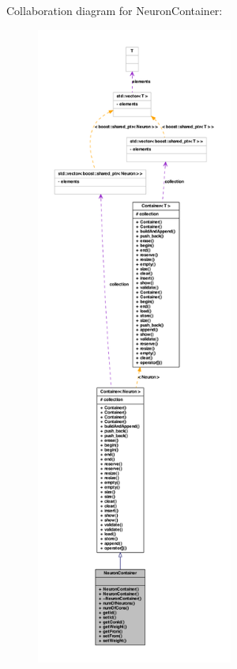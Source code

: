 Collaboration diagram for NeuronContainer:
\nopagebreak
\begin{figure}[H]
\begin{center}
\leavevmode
\includegraphics[height=600pt]{class_neuron_container__coll__graph}
\end{center}
\end{figure}
